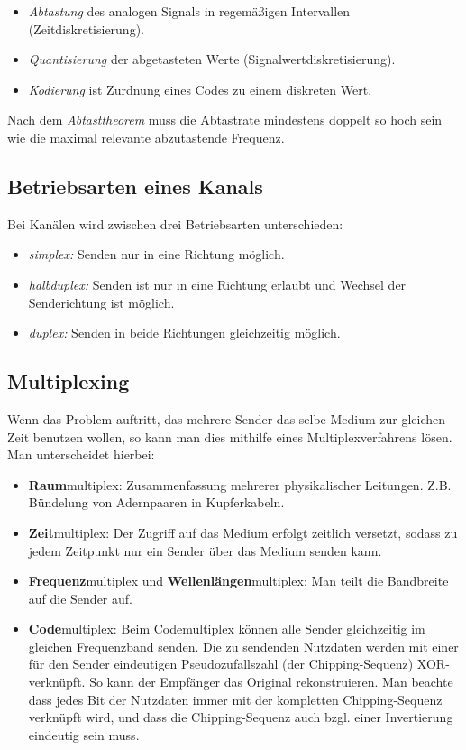 \documentclass[a4paper,parskip=half*,DIV=15,fontsize=11pt]{scrartcl}
\begin{document}
\begin{itemize}
\item \emph{Abtastung} des analogen Signals in regemäßigen Intervallen (Zeitdiskretisierung).
\item \emph{Quantisierung} der abgetasteten Werte (Signalwertdiskretisierung).
\item \emph{Kodierung} ist Zurdnung eines Codes zu einem diskreten Wert.
\end{itemize}

Nach dem \emph{Abtasttheorem} muss die Abtastrate mindestens doppelt so hoch sein wie die maximal relevante abzutastende Frequenz.

\subsection{Betriebsarten eines Kanals}

Bei Kanälen wird zwischen drei Betriebsarten unterschieden:

\begin{itemize}
\item \emph{simplex:} Senden nur in eine Richtung möglich.
\item \emph{halbduplex:} Senden ist nur in eine Richtung erlaubt und Wechsel der Senderichtung ist möglich.
\item \emph{duplex:} Senden in beide Richtungen gleichzeitig möglich.
\end{itemize}

\subsection{Multiplexing}
Wenn das Problem auftritt, das mehrere Sender das selbe Medium zur gleichen Zeit benutzen wollen, so kann man dies mithilfe eines Multiplexverfahrens lösen. Man unterscheidet hierbei:

\begin{itemize}
	\item \textbf{Raum}multiplex: Zusammenfassung mehrerer physikalischer Leitungen. Z.B. Bündelung von Adernpaaren in Kupferkabeln.
    \item \textbf{Zeit}multiplex: Der Zugriff auf das Medium erfolgt zeitlich versetzt, sodass zu jedem Zeitpunkt nur ein Sender über das Medium senden kann.
    \item \textbf{Frequenz}multiplex und \textbf{Wellenlängen}multiplex: Man teilt die Bandbreite auf die Sender auf.
    \item \textbf{Code}multiplex: Beim Codemultiplex können alle Sender gleichzeitig im gleichen Frequenzband senden. Die zu sendenden Nutzdaten werden mit einer für den Sender eindeutigen Pseudozufallszahl (der Chipping-Sequenz) XOR-verknüpft. So kann der Empfänger das Original rekonstruieren. Man beachte dass jedes Bit der Nutzdaten immer mit der kompletten Chipping-Sequenz verknüpft wird, und dass die Chipping-Sequenz auch bzgl. einer Invertierung eindeutig sein muss.
\end{itemize}
\end{document}
